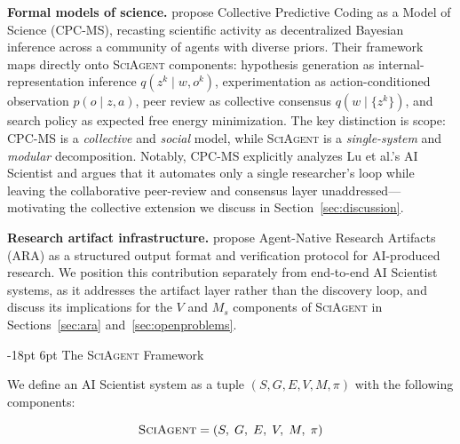 \documentclass[11pt]{article}
\makeatletter
\renewcommand\section{\@startsection{section}{1}{\z@}%
  {-18pt \@plus -4pt \@minus -2pt}%
  {6pt \@plus 2pt}%
  {\normalfont\large\bfseries}}
\newcommand{\sgmvpi}{$(S, G, E, V, M, \pi)$}
\newcommand{\framework}{\textsc{SciAgent}}
\makeatother
\begin{document}
\textbf{Formal models of science.} \citet{taniguchi2024cpc} propose Collective Predictive Coding as a Model of Science (CPC-MS), recasting scientific activity as decentralized Bayesian inference across a community of agents with diverse priors. Their framework maps directly onto \framework{} components: hypothesis generation as internal-representation inference $q(z^k \mid w, o^k)$, experimentation as action-conditioned observation $p(o \mid z, a)$, peer review as collective consensus $q(w \mid \{z^k\})$, and search policy as expected free energy minimization. The key distinction is scope: CPC-MS is a \emph{collective} and \emph{social} model, while \framework{} is a \emph{single-system} and \emph{modular} decomposition. Notably, CPC-MS explicitly analyzes Lu et al.'s AI Scientist and argues that it automates only a single researcher's loop while leaving the collaborative peer-review and consensus layer unaddressed---motivating the collective extension we discuss in Section~\ref{sec:discussion}.

\textbf{Research artifact infrastructure.} \citet{liu2026lasthuman} propose Agent-Native Research Artifacts (ARA) as a structured output format and verification protocol for AI-produced research. We position this contribution separately from end-to-end AI Scientist systems, as it addresses the artifact layer rather than the discovery loop, and discuss its implications for the $V$ and $M_s$ components of \framework{} in Sections~\ref{sec:ara} and~\ref{sec:openproblems}.

\section{The \framework{} Framework}
\label{sec:framework}

We define an AI Scientist system as a tuple \sgmvpi{} with the following components:

\begin{equation}
  \text{\framework{}} = (S,\; G,\; E,\; V,\; M,\; \pi)
\end{equation}
\end{document}
